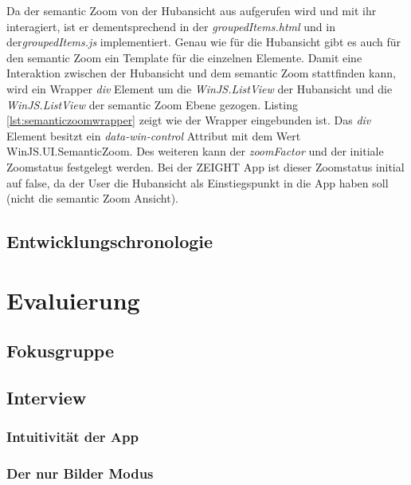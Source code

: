 \documentclass[12pt,a4paper]{scrartcl}
\begin{document}
Da der semantic Zoom von der Hubansicht aus aufgerufen wird und mit ihr interagiert, ist er dementsprechend in der \textit{groupedItems.html} und in der\textit{groupedItems.js} implementiert. Genau wie für die Hubansicht gibt es auch für den semantic Zoom ein Template für die einzelnen Elemente. Damit eine Interaktion zwischen der Hubansicht und dem semantic Zoom stattfinden kann, wird ein Wrapper \textit{div} Element um die \textit{WinJS.ListView} der Hubansicht und die \textit{WinJS.ListView} der semantic Zoom Ebene gezogen. Listing \ref{lst:semanticzoomwrapper} zeigt wie der Wrapper eingebunden ist. Das \textit{div} Element besitzt ein \textit{data-win-control} Attribut mit dem Wert \glqq WinJS.UI.SemanticZoom\grqq. Des weiteren kann der \textit{zoomFactor} und der initiale Zoomstatus festgelegt werden. Bei der ZEIGHT App ist dieser Zoomstatus initial auf false, da der User die Hubansicht als Einstiegspunkt in die App haben soll (nicht die semantic Zoom Ansicht).

\begin{minipage}{\linewidth}
  
\end{minipage}

\subsection{Entwicklungschronologie}
\label{subsec:entwicklungschronologie}


\newpage
\section{Evaluierung} 
\label{sec:evaluierung}

\subsection{Fokusgruppe}
\label{subsec:fokusgruppe}

\subsection{Interview}
\label{subsec:interview}

\subsubsection{Intuitivität der App} 
\label{subsubsec:intuitivitätderapp}

\subsubsection{Der nur Bilder Modus}
\label{subsubsec:nurbildermodus}
\end{document}
